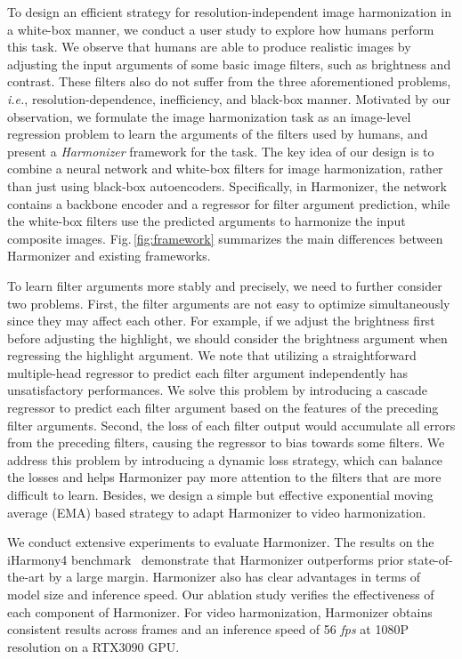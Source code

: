 \documentclass[runningheads]{llncs}
\newcommand{\ke}[1]{{\color{black}#1}}
\begin{document}
To design an efficient strategy for resolution-independent image harmonization in a white-box
manner, we conduct a user study to explore how humans perform this task. We observe that humans are able to produce realistic images by adjusting the input arguments of some basic image filters, such as brightness and contrast.
These filters also do not suffer from the three aforementioned problems, \textit{i.e.},
resolution-dependence, inefficiency, and black-box manner. Motivated by our observation, we formulate the image harmonization task as an image-level regression problem to learn the arguments of the filters used by humans, and present a \textit{Harmonizer} framework for the task. The key idea of our design is to combine a neural network and white-box filters for image harmonization, rather than just using black-box autoencoders. Specifically, in Harmonizer, the network contains a backbone encoder and a regressor for filter argument prediction, while the white-box filters use the predicted arguments to harmonize the input \ke{composite} images. Fig.\,\ref{fig:framework} summarizes the main differences between Harmonizer and existing frameworks. 


\ke{To learn filter arguments more stably and precisely, we need to further consider two problems.}
First, the filter arguments are not easy to optimize simultaneously since they may affect each other. For example, if we adjust the brightness first before adjusting the highlight, we should consider the brightness argument when regressing the highlight argument. We note that utilizing a straightforward multiple-head regressor to predict each filter argument independently has unsatisfactory performances. 
\ke{We solve this problem by introducing a cascade regressor to predict each filter argument based on the features of the preceding filter arguments.}
Second, the loss of each filter output would accumulate all errors from the preceding filters, causing the regressor to bias towards some filters. We address this problem by introducing a dynamic loss strategy, which can balance the losses and helps Harmonizer pay more attention to the filters that are more difficult to learn.
\ke{Besides, we design a simple but effective exponential moving average (EMA) based strategy to adapt Harmonizer to video harmonization.}

We conduct extensive experiments to evaluate Harmonizer. The results on the iHarmony4 benchmark~\cite{DoveNet} demonstrate that Harmonizer outperforms prior state-of-the-art by a large margin. Harmonizer also has clear advantages in terms of model size and inference speed.
Our ablation study verifies the effectiveness of each component of Harmonizer. 
\ke{For video harmonization, Harmonizer obtains consistent results across frames
and an inference speed of 56 {\it fps} at 1080P resolution on a RTX3090 GPU.
}
\end{document}
